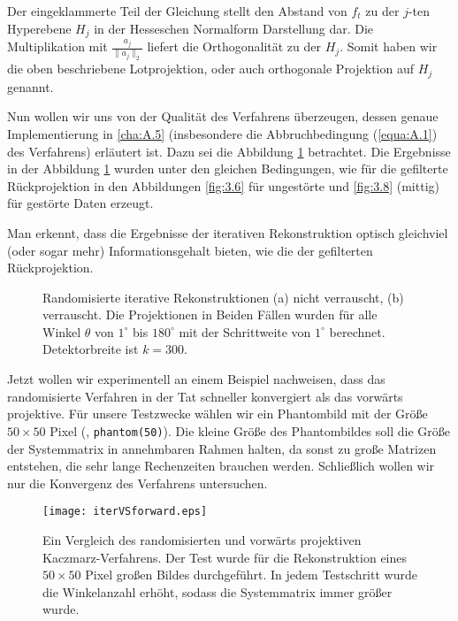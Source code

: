 Der eingeklammerte Teil der Gleichung stellt den Abstand von $f_t$ zu der $j$-ten Hyperebene $H_j$ in der Hesseschen Normalform Darstellung dar. Die Multiplikation mit $\frac{a_j}{\parallel a_j \parallel_{2}}$ liefert die Orthogonalität zu der $H_j$. Somit haben wir die oben beschriebene Lotprojektion, oder auch orthogonale Projektion auf $H_j$ genannt. 

Nun wollen wir uns von der Qualität des Verfahrens überzeugen, dessen genaue Implementierung in \ref{cha:A.5} (insbesondere die Abbruchbedingung (\ref{equa:A.1}) des Verfahrens) erläutert ist. Dazu sei die Abbildung \ref{fig:3.11} betrachtet. Die Ergebnisse in der Abbildung \ref{fig:3.11} wurden unter den gleichen Bedingungen, wie für die gefilterte Rückprojektion in den Abbildungen \ref{fig:3.6} für ungestörte und \ref{fig:3.8} (mittig) für gestörte Daten erzeugt. 

Man erkennt, dass die Ergebnisse der iterativen Rekonstruktion optisch gleichviel (oder sogar mehr) Informationsgehalt bieten, wie die der gefilterten Rückprojektion.
\begin{figure}[!h]
	\begin{center}
	\end{center}
	\caption{Randomisierte iterative Rekonstruktionen (a) nicht verrauscht, (b) verrauscht. Die Projektionen in Beiden Fällen wurden für alle Winkel $\theta$ von $1^{\circ}$ bis $180^{\circ}$ mit der Schrittweite von $1^{\circ}$ berechnet. Detektorbreite ist $k=300$.}
	\label{fig:3.11}
\end{figure}

Jetzt wollen wir experimentell an einem Beispiel nachweisen, dass das randomisierte Verfahren in der Tat schneller konvergiert als das vorwärts projektive. Für unsere Testzwecke wählen wir ein Phantombild mit der Größe $50\times50$ Pixel (\MATLAB, \verb|phantom(50)|). Die kleine Größe des Phantombildes soll die Größe der Systemmatrix in annehmbaren Rahmen halten, da sonst zu große Matrizen entstehen, die sehr lange Rechenzeiten brauchen werden. Schließlich wollen wir nur die Konvergenz des Verfahrens untersuchen.
\begin{figure}[!h]
	\begin{center}
		\texttt{[image: iterVSforward.eps]}
	\end{center}
	\caption{Ein Vergleich des randomisierten und vorwärts projektiven Kaczmarz-Verfahrens. Der Test wurde für die Rekonstruktion eines $50 \times 50$ Pixel großen Bildes durchgeführt. In jedem Testschritt wurde die Winkelanzahl erhöht, sodass die Systemmatrix immer größer wurde.}
	\label{fig:3.12}
\end{figure}

